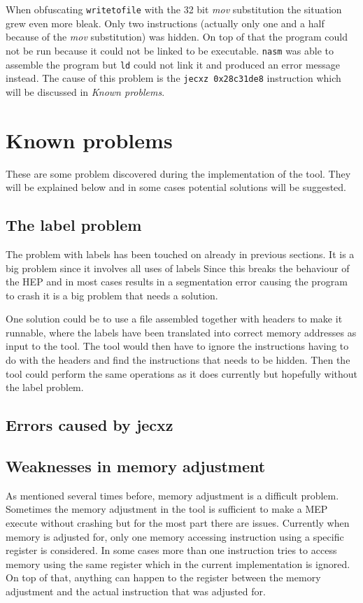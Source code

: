 \documentclass[11pt,twoside]{eitExjobb}
\begin{document}
When obfuscating \texttt{writetofile} with the 32 bit \emph{mov} substitution the situation grew even more bleak. Only two instructions (actually only one and a half because of the \emph{mov} substitution) was hidden. On top of that the program could not be run because it could not be linked to be executable. \texttt{nasm} was able to assemble the program but \texttt{ld}\cite{ld} could not link it and produced an error message instead. The cause of this problem is the \texttt{jecxz 0x28c31de8} instruction which will be discussed in \emph{Known problems}.

\section{Known problems}
These are some problem discovered during the implementation of the tool. They will be explained below and in some cases potential solutions will be suggested.

\subsection{The label problem}
The problem with labels has been touched on already in previous sections. It is a big problem since it involves all uses of labels Since this breaks the behaviour of the HEP and in most cases results in a segmentation error causing the program to crash it is a big problem that needs a solution. 

One solution could be to use a file assembled together with headers to make it runnable, where the labels have been translated into correct memory addresses as input to the tool. The tool would then have to ignore the instructions having to do with the headers and find the instructions that needs to be hidden. Then the tool could perform the same operations as it does currently but hopefully without the label problem. 

\subsection{Errors caused by jecxz}


\subsection{Weaknesses in memory adjustment}
As mentioned several times before, memory adjustment is a difficult problem. Sometimes the memory adjustment in the tool is sufficient to make a MEP execute without crashing but for the most part there are issues. Currently when memory is adjusted for, only one memory accessing instruction using a specific register is considered. In some cases more than one instruction tries to access memory using the same register which in the current implementation is ignored. On top of that, anything can happen to the register between the memory adjustment and the actual instruction that was adjusted for. 
\end{document}
